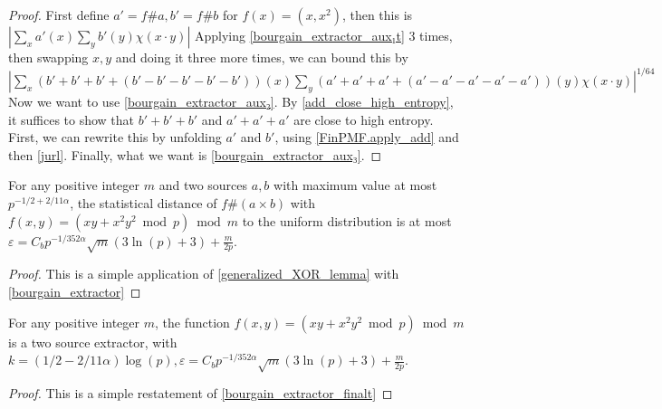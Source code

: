 \begin{proof}
    \leanok
    First define $a' = f \# a, b' = f \# b$ for $f(x) = (x, x^2)$, then this is $|\sum_x a'(x) \sum_y b'(y) \chi(x \cdot y)|$
    Applying \ref{bourgain_extractor_aux₁t} 3 times, then swapping $x, y$ and doing it three more times, we can bound this by
    $ |\sum_x (b' + b' + b' + (b' - b' - b' - b' - b'))(x) \sum_y (a' + a' + a' + (a' - a' - a' - a' - a'))(y) \chi(x\cdot y)|^{1/64} $
    Now we want to use \ref{bourgain_extractor_aux₂}.
    By \ref{add_close_high_entropy}, it suffices to show that $b' + b' + b'$ and $a' + a' + a'$ are close to high entropy.
    First, we can rewrite this by unfolding $a'$ and $b'$, using \ref{FinPMF.apply_add} and then \ref{jurl}.
    Finally, what we want is \ref{bourgain_extractor_aux₃}.
\end{proof}

\begin{theorem}
    \label{bourgain_extractor_finalt}
    \leanok
    For any positive integer $m$ and two sources $a, b$ with maximum value at most $p^{-1/2 + 2/11 \alpha}$,
    the statistical distance of $f \# (a \times b)$ with $f(x, y) = (xy + x^2 y^2 \bmod p) \bmod{m}$ to the uniform distribution
    is at most $\varepsilon = C_b p^{-1/352 \alpha} \sqrt{m} (3 \ln(p) + 3) + \frac{m}{2p}$.
\end{theorem}

\begin{proof}
    \leanok
    This is a simple application of \ref{generalized_XOR_lemma} with \ref{bourgain_extractor}
\end{proof}

\begin{theorem}
    \label{bourgain_extractor_final}
    \leanok
    For any positive integer $m$, the function $f(x, y) = (xy + x^2 y^2 \bmod p) \bmod{m}$ is a two source extractor, with
    $k = (1/2 - 2/11 \alpha) \log(p), \varepsilon = C_b p^{-1/352 \alpha} \sqrt{m} (3 \ln(p) + 3) + \frac{m}{2p}$.
\end{theorem}

\begin{proof}
    \leanok
    This is a simple restatement of \ref{bourgain_extractor_finalt}
\end{proof}
